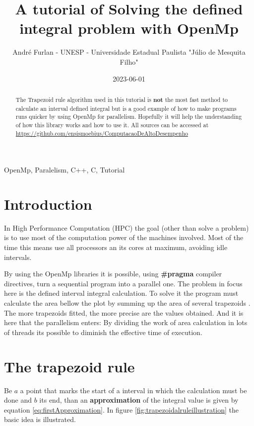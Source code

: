 


	\title{A tutorial of Solving the defined integral problem with OpenMp}
	\author{André Furlan - UNESP - Universidade Estadual Paulista "Júlio de Mesquita Filho"}
	\date{2023-06-01}
	\maketitle
	
	\begin{abstract}
		The Trapezoid rule algorithm used in this tutorial is \textbf{not} the most fast method to calculate an interval defined integral but is a good example of how to make programs runs quicker by using OpenMp for parallelism. Hopefully it will help the understanding of how this library works and how to use it. All sources can be accessed at \href{https://github.com/ensismoebius/ComputacaoDeAltoDesempenho}{https://github.com/ensismoebius/ComputacaoDeAltoDesempenho}
	\end{abstract}
	
	\begin{IEEEkeywords}
		OpenMp, Paralelism, C++, C, Tutorial
	\end{IEEEkeywords}
	
	\section{Introduction}
	\par In High Performance Computation (HPC) the goal (other than solve a problem) is to use most of the computation power of the machines involved. Most of the time this means use all processors an its cores at maximum, avoiding idle intervals.
	\par By using the OpenMp \cite{openmp08} libraries it is possible, using \textbf{\#pragma} compiler directives, turn a sequential program into a parallel one. The problem in focus here is the defined interval integral calculation. To solve it the program must calculate the area bellow the plot by summing up the area of several trapezoids \cite{hildebrand1987introduction}. The more trapezoids fitted, the more precise are the values obtained. And it is here that the parallelism enters: By dividing the work of area calculation in lots of threads its possible to diminish the effective time of execution.
	\section{The trapezoid rule}
	\par Be $a$ a point that marks the start of a interval in which the calculation must be done and $b$ its end, than an \textbf{approximation} of the integral value is given by equation \ref{eq:firstApproximation}. In figure \ref{fig:trapezoidalruleillustration} the basic idea is illustrated.\newline
	
